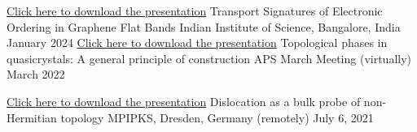 

\begin{cventries}

	\cventry
	{\href{https://drive.google.com/file/d/1OpPcqvn78Uffwwdk_xJLz_MCEl7bEjHX/view?usp=sharing}{Click \underline{here} to download the presentation}} %
	{Transport Signatures of Electronic
		Ordering in Graphene Flat Bands} %
	{Indian Institute of Science, Bangalore, India} %
	{January 2024} %
	{
	}
  \cventry
    {\href{https://drive.google.com/file/d/1HrlFGdNeFf5c6VuSyOaXjgsDxlA-f_bh/view?usp=sharing}{Click \underline{here} to download the presentation}} %
    {Topological phases in quasicrystals:
    	A general principle of construction} %
    {APS March Meeting (virtually)} %
    {March 2022} %
    {
    }

  \cventry
	{\href{https://drive.google.com/file/d/18EtxINc68yc_Dt_sxsVkAIQNs8viJxYq/view?usp=sharing}{Click \underline{here} to download the presentation}} %
	{Dislocation as a bulk probe of non-Hermitian topology} %
	{MPIPKS, Dresden, Germany (remotely)} %
	{July 6, 2021} %
	{
	}
\end{cventries}
